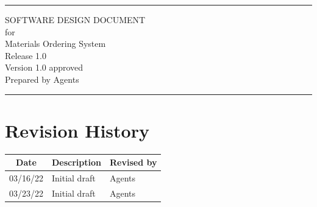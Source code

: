 \documentclass[letterpaper,12pt,oneside,listof=totoc]{scrreprt}
\date{\today}
\author{} %
\def\myversion{1.0 }
\begin{document}
\begin{titlepage}
\flushright
\rule{\textwidth}{5pt}\vskip1cm
\Huge{SOFTWARE DESIGN DOCUMENT}\\
\vspace{1.5cm}
for\\
\vspace{1.5cm}
Materials Ordering System\\
\vspace{1.5cm}
\LARGE{Release 1.0\\}
\vspace{1.5cm}
\LARGE{Version \myversion approved\\}
\vspace{1.5cm}
Prepared by Agents\\
\vfill
\rule{\textwidth}{5pt}
\end{titlepage}

\tableofcontents

\listoffigures

\listoftables

\chapter*{Revision History}

\begin{tabular}{| c | p{} | p{} |}
\hline
Date     & Description   & Revised by \\
\hline
03/16/22 & Initial draft & Agents \\
\hline
03/23/22 & Initial draft & Agents \\
\hline
\end{tabular}
\end{document}
